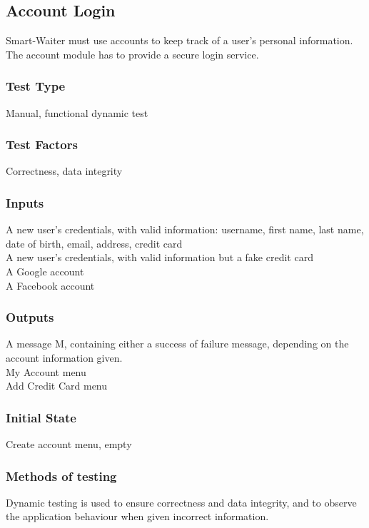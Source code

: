 \documentclass[12pt]{article}
\begin{document}
\subsection{Account Login}
Smart-Waiter must use accounts to keep track of a user's personal information. The account module has to provide a secure login service. 
\subsubsection{Test Type}
Manual, functional dynamic test
\subsubsection{Test Factors}
Correctness, data integrity
\subsubsection{Inputs}
A new user's credentials, with valid information: username, first name, last name, date of birth, email, address, credit card \\
A new user's credentials, with valid information but a fake credit card \\
A Google account \\
A Facebook account \\
\subsubsection{Outputs}
A message M, containing either a success of failure message, depending on the account information given. \\
My Account menu \\
Add Credit Card menu \\
\subsubsection{Initial State}
Create account menu, empty
\subsubsection{Methods of testing}
Dynamic testing is used to ensure correctness and data integrity, and to observe the application behaviour when given incorrect information.
\end{document}
